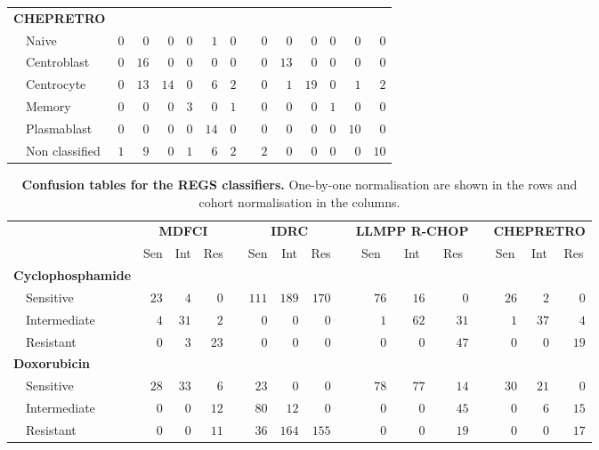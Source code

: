 \documentclass{article}
\begin{document}
\begin{table}[!tbp]
\begin{center}
\begin{tabular}{lrrrrrrcrrrrrr}
\hline
{\bfseries CHEPRETRO}&&&&&&&&&&&&&\tabularnewline
~~Naive&$0$&$ 0$&$  0$&$0$&$ 1$&$0$&&$0$&$ 0$&$  0$&$ 0$&$ 0$&$ 0$\tabularnewline
~~Centroblast&$0$&$16$&$  0$&$0$&$ 0$&$0$&&$0$&$13$&$  0$&$ 0$&$ 0$&$ 0$\tabularnewline
~~Centrocyte&$0$&$13$&$ 14$&$0$&$ 6$&$2$&&$0$&$ 1$&$ 19$&$ 0$&$ 1$&$ 2$\tabularnewline
~~Memory&$0$&$ 0$&$  0$&$3$&$ 0$&$1$&&$0$&$ 0$&$  0$&$ 1$&$ 0$&$ 0$\tabularnewline
~~Plasmablast&$0$&$ 0$&$  0$&$0$&$14$&$0$&&$0$&$ 0$&$  0$&$ 0$&$10$&$ 0$\tabularnewline
~~Non classified&$1$&$ 9$&$  0$&$1$&$ 6$&$2$&&$2$&$ 0$&$  0$&$ 0$&$ 0$&$10$\tabularnewline
\hline
\end{tabular}
\end{center}
\end{table}


\begin{table}[!tbp]
\small
\caption{\textbf{Confusion tables for the REGS classifiers.} One-by-one normalisation are shown in the rows and cohort normalisation in the columns.\label{tab:confusiondrugonebyone}}
\begin{center}
\begin{tabular}{lrrrcrrrcrrrcrrr}
\hline\hline
\multicolumn{1}{l}{\bfseries  }&\multicolumn{3}{c}{\bfseries MDFCI}&\multicolumn{1}{c}{\bfseries }&\multicolumn{3}{c}{\bfseries IDRC}&\multicolumn{1}{c}{\bfseries }&\multicolumn{3}{c}{\bfseries LLMPP R-CHOP}&\multicolumn{1}{c}{\bfseries }&\multicolumn{3}{c}{\bfseries CHEPRETRO}\tabularnewline
\cline{2-4} \cline{6-8} \cline{10-12} \cline{14-16}
\multicolumn{1}{l}{}&\multicolumn{1}{c}{Sen}&\multicolumn{1}{c}{Int}&\multicolumn{1}{c}{Res}&\multicolumn{1}{c}{}&\multicolumn{1}{c}{Sen}&\multicolumn{1}{c}{Int}&\multicolumn{1}{c}{Res}&\multicolumn{1}{c}{}&\multicolumn{1}{c}{Sen}&\multicolumn{1}{c}{Int}&\multicolumn{1}{c}{Res}&\multicolumn{1}{c}{}&\multicolumn{1}{c}{Sen}&\multicolumn{1}{c}{Int}&\multicolumn{1}{c}{Res}\tabularnewline
\hline
{\bfseries Cyclophosphamide}&&&&&&&&&&&&&&&\tabularnewline
~~Sensitive&$23$&$ 4$&$ 0$&&$111$&$189$&$170$&&$76$&$16$&$ 0$&&$26$&$ 2$&$ 0$\tabularnewline
~~Intermediate&$ 4$&$31$&$ 2$&&$  0$&$  0$&$  0$&&$ 1$&$62$&$31$&&$ 1$&$37$&$ 4$\tabularnewline
~~Resistant&$ 0$&$ 3$&$23$&&$  0$&$  0$&$  0$&&$ 0$&$ 0$&$47$&&$ 0$&$ 0$&$19$\tabularnewline
\hline
{\bfseries Doxorubicin}&&&&&&&&&&&&&&&\tabularnewline
~~Sensitive&$28$&$33$&$ 6$&&$ 23$&$  0$&$  0$&&$78$&$77$&$14$&&$30$&$21$&$ 0$\tabularnewline
~~Intermediate&$ 0$&$ 0$&$12$&&$ 80$&$ 12$&$  0$&&$ 0$&$ 0$&$45$&&$ 0$&$ 6$&$15$\tabularnewline
~~Resistant&$ 0$&$ 0$&$11$&&$ 36$&$164$&$155$&&$ 0$&$ 0$&$19$&&$ 0$&$ 0$&$17$\tabularnewline

\end{tabular}
\end{center}
\end{table}
\end{document}
